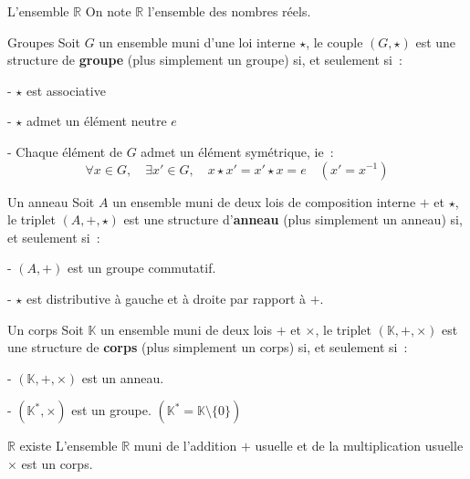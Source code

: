 \documentclass{classe}
\renewcommand*{\K}{\mathbb{K}}
\begin{document}
\begin{définition}{L'ensemble $\mathbb{R}$}{}
On note $\mathbb{R}$ l'ensemble des nombres réels.
\end{définition}

\begin{définition}{Groupes}{}
Soit $G$ un ensemble muni d'une loi interne $\star$, le couple $(G,\star)$ est une structure de {\bf groupe}
 (plus simplement un groupe) si, et seulement si~:
\par\hskip1cm - $\star$ est associative
\par\hskip1cm - $\star$ admet un \'{e}l\'{e}ment neutre $e$
\par\hskip1cm - Chaque \'{e}l\'{e}ment de $G$ admet un \'{e}l\'{e}ment sym\'{e}trique, ie~:
$$\forall x\in G,\quad \exists x'\in G,\quad x\star x'= x'\star x = e\quad (x'=x^{-1})$$
\end{définition}

\begin{définition}{Un anneau}{}
Soit $A$ un ensemble muni de deux lois de composition interne $+$ et
$\star$, le triplet $(A,+,\star)$ est une structure d'{\bf anneau}
(plus simplement un anneau) si, et seulement si~:
\par\hskip1cm - $(A,+)$ est un groupe commutatif.
\par\hskip1cm - $\star$ est distributive \`{a} gauche et \`{a} droite par rapport \`{a} $+$.
\end{définition}

\begin{définition}{Un corps}{}
Soit $\K$ un ensemble muni de deux lois $+$ et $\times$, le triplet 
$(\K,+,\times)$ est une structure
de \textbf{corps} (plus simplement un corps) si, et seulement si~:
\par\hskip1cm - $(\K,+,\times)$ est un anneau. 
\par\hskip1cm - $(\K^*,\times)$ est un groupe. $(\K^*=\K\setminus\{0\})$
\end{définition}

\begin{théorème}{$\mathbb{R}$ existe}{}
	L'ensemble $\mathbb{R}$ muni de l'addition $+$ usuelle et de la multiplication usuelle $\times$ est un corps.
\end{théorème}
\end{document}
